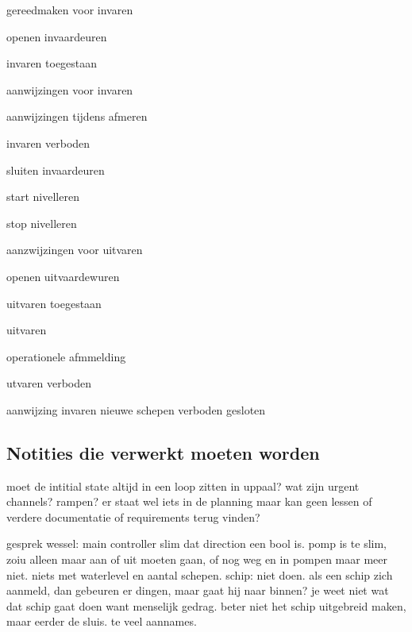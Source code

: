 {{{{{{{{{\begin{itemize}
\begin{minipage}{0.4\linewidth}
	\end{minipage}
\begin{minipage}{0.4\linewidth}

		\item gereedmaken voor invaren
		\item openen invaardeuren
		\item invaren toegestaan
		\item aanwijzingen voor invaren
		\item aanwijzingen tijdens afmeren
		\item invaren verboden
		\item sluiten invaardeuren
		\item start nivelleren
		\item stop nivelleren
		\item aanzwijzingen voor uitvaren
		\item openen uitvaardewuren
		\item uitvaren toegestaan
	
\end{minipage}
	\begin{minipage}{0.4\linewidth}
	\item uitvaren
	\item operationele afmmelding
	\item utvaren verboden
	\item aanwijzing invaren nieuwe schepen
	\invaren verboden
	\deuren gesloten
	\end{minipage}
\end{itemize}


\subsection{Notities die verwerkt moeten worden}

moet de intitial state altijd in een loop zitten in uppaal?
wat zijn urgent channels?
rampen? er staat wel iets in de planning maar kan geen lessen of verdere documentatie of requirements terug vinden?	


gesprek wessel:
main controller slim dat direction een bool is. 
pomp is te slim, zoiu alleen maar aan of uit moeten gaan, of nog weg en in pompen maar meer niet. niets met waterlevel en aantal schepen.
schip: niet doen. als een schip zich aanmeld, dan gebeuren er dingen, maar gaat hij naar binnen? je weet niet wat dat schip gaat doen want menselijk gedrag. beter niet het schip uitgebreid maken, maar eerder de sluis. te veel aannames.

}}}}}}}}}
